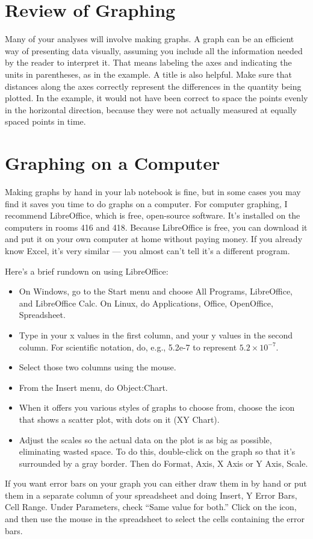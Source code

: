 
\section{Review of Graphing}
Many of your analyses will involve making graphs. A graph
can be an efficient way of presenting data visually,
assuming you include all the information needed by the
reader to interpret it. That means labeling the axes and
indicating the units in parentheses, as in the example. A
title is also helpful. Make sure that distances along the
axes correctly represent the differences in the quantity
being plotted. In the example, it would not have been
correct to space the points evenly in the horizontal
direction, because they were not actually measured at
equally spaced points in time. 



\section{Graphing on a Computer}
Making graphs by hand in your lab notebook is fine, but in
some cases you may find it saves you time to do graphs on a
computer. For computer graphing, I recommend LibreOffice, which
is free, open-source software. It's installed on the computers
in rooms 416 and 418. Because LibreOffice is free, you can download
it and put it on your own computer at home without paying money.
If you already know Excel, it's very similar --- you almost can't
tell it's a different program.

Here's a brief rundown on using LibreOffice:
\begin{itemize}
  \item[] On Windows, go to the Start menu and choose All Programs, LibreOffice, and LibreOffice Calc.
          On Linux, do Applications, Office, OpenOffice, Spreadsheet.
  \item[] Type in your x values in the first column, and your
  	y values in the second column. For scientific notation, do, e.g., 5.2e-7
        to represent $5.2\times10^{-7}$.
  \item[] Select those two columns using the mouse.
  \item[] From the Insert menu, do Object:Chart.
  \item[] When it offers you various styles of graphs to choose from, choose
          the icon that shows a scatter plot, with dots on it  (XY Chart).
  \item[] Adjust the scales so the actual data on the plot is as big as possible,
          eliminating wasted space. To do this, double-click on the graph so that it's
          surrounded by a gray border. Then do Format, Axis, X Axis or Y Axis, Scale.
\end{itemize}
If you want error bars on your graph you can either draw them in by hand or put them in a
separate column of your spreadsheet and doing Insert, Y Error Bars, Cell Range. Under Parameters,
check ``Same value for both.'' Click on the icon, and then use the mouse in the spreadsheet to select the cells
containing the error bars.

